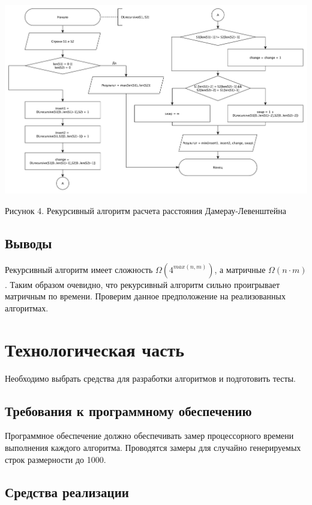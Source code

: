 \documentclass[a4paper,12pt]{article}
\begin{document}
\begin{center}
    \includegraphics[scale=0.4]{DLrecursive}

    Рисунок 4. Рекурсивный алгоритм расчета расстояния Дамерау-Левенштейна
\end{center}

\subsection{Выводы}

Рекурсивный алгоритм имеет сложность $\Omega (4^{max(n,m)})$, а матричные
$\Omega (n \cdot m)$. Таким образом очевидно, что рекурсивный алгоритм
сильно проигрывает матричным по времени. Проверим данное предположение
на реализованных алгоритмах.

\newpage
\section{Технологическая часть}

Необходимо выбрать средства для разработки алгоритмов и подготовить
тесты.

\subsection{Требования к программному обеспечению}

Программное обеспечение должно обеспечивать замер процессорного времени
выполнения каждого алгоритма. Проводятся замеры для случайно генерируемых
строк размерности до 1000.

\subsection{Средства реализации}
\end{document}
